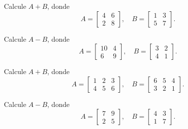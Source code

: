 
\begin{ejercicio}
Calcule $A+B$, donde
\[
A=\begin{bmatrix} 4 & 6 \\ 2 & 8 \end{bmatrix}, \quad
B=\begin{bmatrix} 1 & 3 \\ 5 & 7 \end{bmatrix}.
\]
\end{ejercicio}
\muestraSolucion{
\[
A+B=\begin{bmatrix} 5 & 9 \\ 7 & 15 \end{bmatrix}.
\]
}

\begin{ejercicio}
Calcule $A-B$, donde
\[
A=\begin{bmatrix} 10 & 4 \\ 6 & 9 \end{bmatrix}, \quad
B=\begin{bmatrix} 3 & 2 \\ 4 & 1 \end{bmatrix}.
\]
\end{ejercicio}
\muestraSolucion{
\[
A-B=\begin{bmatrix} 7 & 2 \\ 2 & 8 \end{bmatrix}.
\]
}

\begin{ejercicio}
Calcule $A+B$, donde
\[
A=\begin{bmatrix} 1 & 2 & 3 \\ 4 & 5 & 6 \end{bmatrix}, \quad
B=\begin{bmatrix} 6 & 5 & 4 \\ 3 & 2 & 1 \end{bmatrix}.
\]
\end{ejercicio}
\muestraSolucion{
\[
A+B=\begin{bmatrix} 7 & 7 & 7 \\ 7 & 7 & 7 \end{bmatrix}.
\]
}

\begin{ejercicio}
Calcule $A-B$, donde
\[
A=\begin{bmatrix} 7 & 9 \\ 2 & 5 \end{bmatrix}, \quad
B=\begin{bmatrix} 4 & 3 \\ 1 & 7 \end{bmatrix}.
\]
\end{ejercicio}
\muestraSolucion{
\[
A-B=\begin{bmatrix} 3 & 6 \\ 1 & -2 \end{bmatrix}.
\]
}

